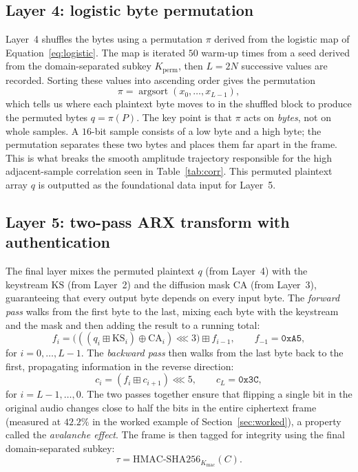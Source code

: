 \documentclass[pdflatex,sn-mathphys-num]{sn-jnl}%
\theoremstyle{thmstyleone}%
\theoremstyle{thmstyletwo}%
\theoremstyle{thmstylethree}%
\begin{document}
\subsection{Layer 4: logistic byte permutation}
\label{sec:layer4}

Layer~4 shuffles the bytes using a permutation $\pi$ derived from the logistic map of Equation~\eqref{eq:logistic}. The map is iterated $50$ warm-up times from a seed derived from the domain-separated subkey $K_{\mathrm{perm}}$, then $L=2N$ successive values are recorded. Sorting these values into ascending order gives the permutation
\begin{equation}
\pi = \operatorname{argsort}(x_0,\dots,x_{L-1}),
\label{eq:perm}
\end{equation}
which tells us where each plaintext byte moves to in the shuffled block to produce the permuted bytes $q = \pi(P)$. The key point is that $\pi$ acts on \emph{bytes}, not on whole samples. A $16$-bit sample consists of a low byte and a high byte; the permutation separates these two bytes and places them far apart in the frame. This is what breaks the smooth amplitude trajectory responsible for the high adjacent-sample correlation seen in Table~\ref{tab:corr}. This permuted plaintext array $q$ is outputted as the foundational data input for Layer~5.

\subsection{Layer 5: two-pass ARX transform with authentication}
\label{sec:layer5}

The final layer mixes the permuted plaintext $q$ (from Layer~4) with the keystream $\mathrm{KS}$ (from Layer~2) and the diffusion mask $\mathrm{CA}$ (from Layer~3), guaranteeing that every output byte depends on every input byte. The \emph{forward pass} walks from the first byte to the last, mixing each byte with the keystream and the mask and then adding the result to a running total:
\begin{equation}
f_i = \big(((q_i \boxplus \mathrm{KS}_i) \oplus \mathrm{CA}_i) \lll 3\big) \boxplus f_{i-1}, \qquad f_{-1}=\texttt{0xA5},
\label{eq:fwd}
\end{equation}
for $i=0,\dots,L-1$. The \emph{backward pass} then walks from the last byte back to the first, propagating information in the reverse direction:
\begin{equation}
c_i = (f_i \boxplus c_{i+1}) \lll 5, \qquad c_L=\texttt{0x3C},
\label{eq:bwd}
\end{equation}
for $i=L-1,\dots,0$. The two passes together ensure that flipping a single bit in the original audio changes close to half the bits in the entire ciphertext frame (measured at $42.2\%$ in the worked example of Section~\ref{sec:worked}), a property called the \emph{avalanche effect}. The frame is then tagged for integrity using the final domain-separated subkey:
\begin{equation}
\tau = \mathrm{HMAC\text{-}SHA256}_{K_{\mathrm{mac}}}(C).
\label{eq:tag}
\end{equation}
\end{document}
